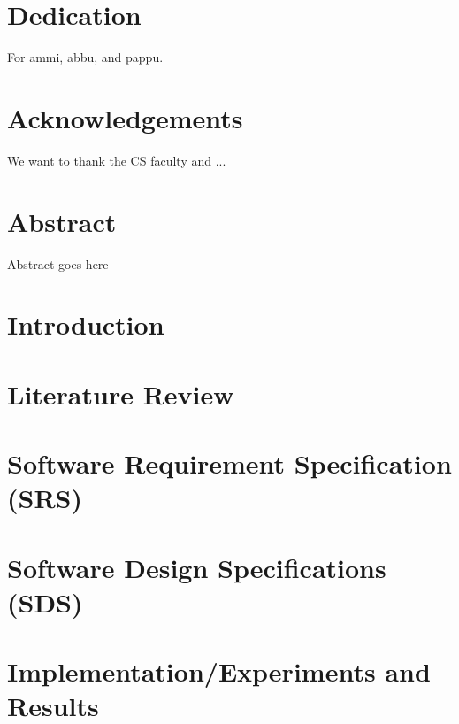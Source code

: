 \documentclass[12pt]{report}
\begin{document}
\chapter*{Dedication}
For ammi, abbu, and pappu.

\chapter*{Acknowledgements}
We want to thank the CS faculty and ...

\chapter*{Abstract}
Abstract goes here

\tableofcontents
\listoffigures
\listoftables


\chapter{Introduction}
\label{chap:intro}


\chapter{Literature Review}
\label{chap:lit}


\chapter{Software Requirement Specification (SRS)}
\label{chap:srs}


\chapter{Software Design Specifications (SDS)}
\label{chap:sds}


\chapter{Implementation/Experiments and Results}
\label{chap:results}

\end{document}
